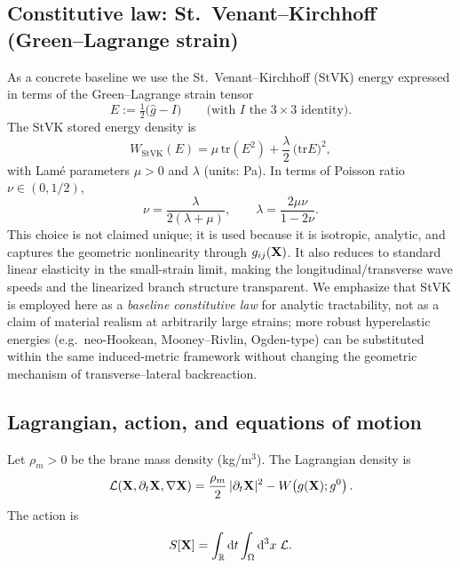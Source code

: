\subsection{Constitutive law: St.\ Venant--Kirchhoff (Green--Lagrange strain)}

As a concrete baseline we use the St.\ Venant--Kirchhoff (StVK) energy expressed in terms of the
Green--Lagrange strain tensor
\begin{equation}
  E := \tfrac12\big(\widehat g - I\big)
  \qquad\text{(with $I$ the $3\times 3$ identity)}.
  \label{eq:green-lagrange-strain}
\end{equation}
The StVK stored energy density is
\begin{equation}
  W_{\text{StVK}}(E)
  = \mu\,\mathrm{tr}(E^2)+\frac{\lambda}{2}\,\big(\mathrm{tr}E\big)^2,
  \label{eq:stvk}
\end{equation}
with Lam\'e parameters $\mu>0$ and $\lambda$ (units: Pa). In terms of Poisson ratio $\nu\in(0,1/2)$,
\begin{equation}
\nu=\frac{\lambda}{2(\lambda+\mu)},
\qquad
\lambda=\frac{2\mu\nu}{1-2\nu}.
\label{eq:poisson-lame}
\end{equation}
This choice is not claimed unique; it is used because it is isotropic, analytic, and captures the
geometric nonlinearity through $g_{ij}(\mathbf{X})$.
It also reduces to standard linear elasticity in the small-strain limit, making the longitudinal/transverse
wave speeds and the linearized branch structure transparent.
We emphasize that StVK is employed here as a \emph{baseline constitutive law} for analytic tractability, not as a
claim of material realism at arbitrarily large strains; more robust hyperelastic energies (e.g.\ neo-Hookean,
Mooney--Rivlin, Ogden-type) can be substituted within the same induced-metric framework without changing the
geometric mechanism of transverse--lateral backreaction.

\subsection{Lagrangian, action, and equations of motion}

Let $\rho_m>0$ be the brane mass density (kg/m$^3$). The Lagrangian density is
\begin{equation}
  \mathcal{L}(\mathbf{X},\partial_t\mathbf{X},\nabla\mathbf{X})
  =\frac{\rho_m}{2}\,|\partial_t\mathbf{X}|^2
  -W\!\left(g(\mathbf{X});g^0\right).
  \label{eq:lagrangian-density}
\end{equation}
The action is
\begin{equation}
  S[\mathbf{X}] = \int_{\mathbb{R}}\mathrm{d} t \int_{\Omega} \mathrm{d}^3 x\;\mathcal{L}.
  \label{eq:action}
\end{equation}

